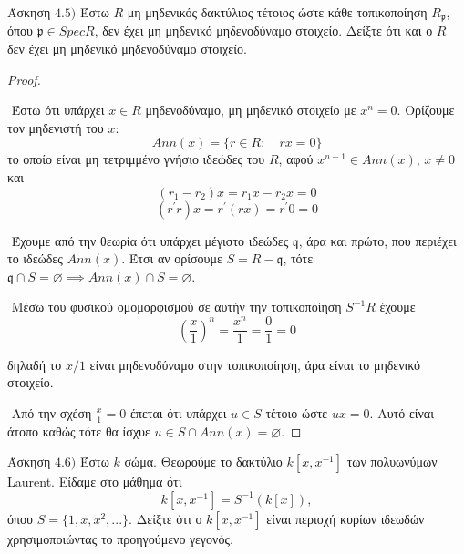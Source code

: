 \documentclass[oneside,a4paper]{article}
\newcommand {\tl}{\textlatin}
\begin{document}
\noindent Άσκηση $4.5)$
\quad Έστω $R$ μη μηδενικός δακτύλιος τέτοιος ώστε κάθε τοπικοποίηση $R_{\mathfrak{p}}$, όπου $\mathfrak{p} \in SpecR$, δεν έχει μη μηδενικό μηδενοδύναμο στοιχείο. Δείξτε ότι και ο $R$ δεν έχει μη μηδενικό μηδενοδύναμο στοιχείο.

\begin{proof} $ $

	$ $\newline
	Έστω ότι υπάρχει $x \in R$ μηδενοδύναμο, μη μηδενικό στοιχείο με $x^n= 0$. Ορίζουμε τον μηδενιστή του $x$:
	$$Ann(x) = \{r \in R: \quad rx = 0\}$$
	το οποίο είναι μη τετριμμένο γνήσιο ιδεώδες του $R$, αφού $x^{n-1} \in Ann(x)$, $x \neq 0$ και
	$$(r_1 - r_2)x = r_1 x - r_2 x = 0$$
	$$(r^{\prime}r)x = r^{\prime} (rx) = r^{\prime} 0 = 0$$
	
	$ $\newline
	Έχουμε από την θεωρία ότι υπάρχει μέγιστο ιδεώδες $\mathfrak{q}$, άρα και πρώτο, που περιέχει το ιδεώδες $Ann(x)$. Έτσι αν ορίσουμε $S = R - \mathfrak{q}$, τότε $\mathfrak{q} \cap S = \varnothing \implies Ann(x) \cap S = \varnothing$.

	$ $\newline
	Μέσω του φυσικού ομομορφισμού σε αυτήν την τοπικοποίηση $S^{-1}R$ έχουμε
	$$\left(\frac{x}1\right)^n = \frac{x^n}1 = \frac01 = 0$$
	
	δηλαδή το $x/1$ είναι μηδενοδύναμο στην τοπικοποίηση, άρα είναι το μηδενικό στοιχείο. 
	
	$ $\newline
	Από την σχέση $\frac{x}1 = 0$ έπεται ότι υπάρχει $u \in S$ τέτοιο ώστε $ux = 0$. Αυτό είναι άτοπο καθώς τότε θα ίσχυε $ u \in S \cap Ann(x) = \varnothing$. 

\end{proof}
\pagebreak


\noindent Άσκηση $4.6)$
\quad Έστω $k$ σώμα. Θεωρούμε το δακτύλιο $k[x, x^{-1}]$ των πολυωνύμων \tl{Laurent}. Είδαμε στο μάθημα ότι $$k[x, x^{-1}]=S^{-1}(k[x]),$$ όπου $S=\{1,x,x^2,...\}.$ Δείξτε ότι ο $k[x, x^{-1}]$  είναι περιοχή κυρίων ιδεωδών χρησιμοποιώντας το προηγούμενο γεγονός.
\end{document}
